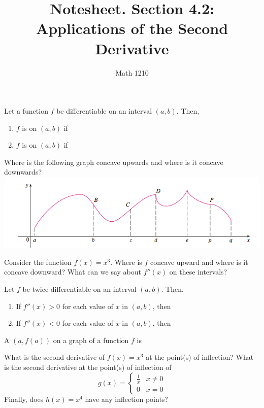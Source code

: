\documentclass[12pt, a4paper]{article}
\author{Math 1210}
\title{Notesheet. Section 4.2: Applications of the Second Derivative}
\date{}
\begin{document}
\maketitle
\nameline
\begin{defi}
  Let a function \(f\) be differentiable on an interval
  \((a,b)\). Then,
  \begin{enumerate}
  \item \(f\) is  on \((a,b)\) if
  \item \(f\) is  on \((a,b)\) if
  \end{enumerate}
\end{defi}
\vspace{-0.5in}
\begin{ex}
  Where is the following graph concave upwards and where is it concave
  downwards?\\
  \includegraphics[scale=0.5]{images/concavity-example}
\end{ex}
\vspace{-2.2in}
\begin{ex}
  Consider the function \(f(x) = x^3\). Where is \(f\) concave upward
  and where is it concave downward? What can we say about \(f''(x)\)
  on these intervals?
\end{ex}
\begin{thrm}
  Let \(f\) be twice differentiable on an interval \((a,b)\). Then,
  \begin{enumerate}
  \item If \(f''(x) > 0\) for each value of \(x\) in \((a,b)\), then
  \item If \(f''(x) < 0\) for each value of \(x\) in \((a,b)\), then
  \end{enumerate}
\end{thrm}
\vspace{-0.5in}
\begin{defi}
  A  \((a,f(a))\) on a graph of a function \(f\) is
\end{defi}
\begin{ex}
  What is the second derivative of \(f(x) = x^3\) at the point(s) of
  inflection? What is the second derivative at the point(s) of
  inflection of \[
    g(x) =
    \begin{cases}
      \frac{1}{x} & x \neq 0\\
      0 & x = 0
    \end{cases}
  \]
  Finally, does \(h(x) = x^4\) have any inflection points?
\end{ex}
\end{document}
